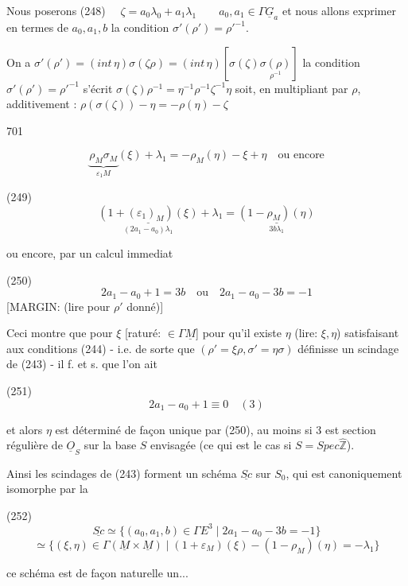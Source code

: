 Nous poserons
(248) $\quad \zeta = a_0 \lambda_0 + a_1 \lambda_1 \quad \quad a_0, a_1 \in \Gamma \underline{G}_a$
et nous allons exprimer en termes
de $a_0, a_1, b$ la condition $\sigma'(\rho') = \rho'^{-1}$.

On a
$\sigma'(\rho') = (int \, \eta) \sigma(\zeta \rho) = (int \, \eta) [\sigma(\zeta) \underset{\rho^{-1}}{\sigma(\rho)}]$
la condition $\sigma'(\rho') = \rho'^{-1}$ s'écrit
$\sigma(\zeta) \rho^{-1} = \eta^{-1} \rho^{-1} \zeta^{-1} \eta$
soit, en multipliant par $\rho$, additivement :
$\rho(\sigma(\zeta)) - \eta = -\rho(\eta) - \zeta$

\newpage


701

$$ \underset{\varepsilon_1 M}{\underbrace{\rho_M \sigma_M}} (\xi) + \lambda_1 = -\rho_M(\eta) - \xi + \eta \quad \text{ou encore} $$

(249) $$ \underset{(2a_1 - a_0)\lambda_1}{\underline{(1+(\varepsilon_1)_M)(\xi)}} + \lambda_1 = \underset{3b\lambda_1}{\underline{(1-\rho_M)(\eta)}} $$

ou encore, par un calcul immediat

(250) $$ 2a_1 - a_0 + 1 = 3b \quad \text{ou} \quad 2a_1 - a_0 - 3b = -1 $$
[MARGIN: (lire pour $\rho'$ donné)]

Ceci montre que pour $\xi$ [raturé: $\in \Gamma \underline{M}$] pour qu'il existe $\eta$ (lire: $\xi,\eta$) satisfaisant aux conditions (244) - i.e. de sorte que $(\rho' = \xi \rho, \sigma' = \eta \sigma)$ définisse un scindage de (243) - il f. et s. que l'on ait

(251) $$ 2a_1 - a_0 + 1 \equiv 0 \quad (3) $$

et alors $\eta$ est déterminé de façon unique par (250), au moins si 3 est section régulière de $\underline{O}_S$ sur la base $S$ envisagée (ce qui est le cas si $S = Spec \hat{\mathbb{Z}}$).

Ainsi les scindages de (243) forment un schéma $\underline{Sc}$ sur $S_0$, qui est canoniquement isomorphe par la

(252) $$ \underline{Sc} \simeq \{ (a_0, a_1, b) \in \Gamma E^3 \mid 2a_1 - a_0 - 3b = -1 \} $$
$$ \simeq \{ (\xi, \eta) \in \Gamma(\underline{M} \times \underline{M}) \mid (1+\varepsilon_M)(\xi) - (1-\rho_M)(\eta) = -\lambda_1 \} $$

ce schéma est de façon naturelle un...

\newpage


